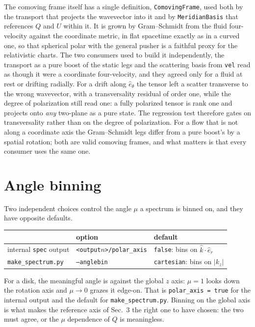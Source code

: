 \documentclass[11pt]{article}
\newcommand{\khat}{\hat{k}}
\begin{document}
The comoving frame itself has a single definition, \texttt{ComovingFrame}, used both by the
transport that projects the wavevector into it and by \texttt{MeridianBasis} that references
$Q$ and $U$ within it. It is grown by Gram--Schmidt from the fluid four-velocity against the
coordinate metric, in flat spacetime exactly as in a curved one, so that spherical polar with
the general pusher is a faithful proxy for the relativistic charts. The two consumers used to
build it independently, the transport as a pure boost of the static legs and the scattering
basis from \texttt{vel} read as though it were a coordinate four-velocity, and they agreed
only for a fluid at rest or drifting radially. For a drift along $\hat{e}_\theta$ the tensor
left a scatter transverse to the wrong wavevector, with a transversality residual of order
one, while the degree of polarization still read one: a fully polarized tensor is rank one and
projects onto \emph{any} two-plane as a pure state. The regression test therefore gates on
transversality rather than on the degree of polarization. For a flow that is not along a
coordinate axis the Gram--Schmidt legs differ from a pure boost's by a spatial rotation; both
are valid comoving frames, and what matters is that every consumer uses the same one.

\section{Angle binning}

Two independent choices control the angle $\mu$ a spectrum is binned on, and they have
opposite defaults.

\begin{table}[h]
\centering
\begin{tabular}{lll}
\toprule
 & option & default \\
\midrule
internal \texttt{spec} output & \texttt{<output$n$>/polar\_axis} & \texttt{false}: bins on $\khat\cdot\hat{e}_r$ \\
\texttt{make\_spectrum.py}    & \texttt{--anglebin}              & \texttt{cartesian}: bins on $|k_z|$ \\
\bottomrule
\end{tabular}
\end{table}

For a disk, the meaningful angle is against the global $z$ axis: $\mu = 1$ looks down the
rotation axis and $\mu \to 0$ grazes it edge-on. That is \texttt{polar\_axis = true} for the
internal output and the default for \texttt{make\_spectrum.py}. Binning on the global axis is
what makes the reference axis of Sec.~3 the right one to have chosen: the two must agree, or
the $\mu$ dependence of $Q$ is meaningless.
\end{document}
